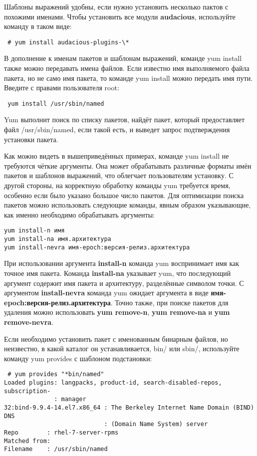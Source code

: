 \documentclass[a4paper,10pt,twoside]{article}
\begin{document}
Шаблоны выражений удобны, если нужно установить несколько пактов с похожими именами. Чтобы установить все модули \textbf{audacious}, используйте команду в таком виде:

\begin{verbatim}
 # yum install audacious-plugins-\*
\end{verbatim} 

В дополнение к именам пакетов и шаблонам выражений, команде yum install также можно передавать имена файлов. Если известно имя выполняемого файла пакета, но не само имя пакета, то команде yum install можно передать имя пути. Введите с правами пользователя root: 
\begin{verbatim}
 yum install /usr/sbin/named
\end{verbatim} 

Yum выполнит поиск по списку пакетов, найдёт пакет, который предоставляет файл /usr/sbin/named, если такой есть, и выведет запрос подтверждения установки пакета.

Как можно видеть в вышеприведённых примерах, команде  yum install не требуются чёткие аргументы. Она может обрабатывать различные форматы имён пакетов и шаблонов выражений, что облегчает пользователям установку. С другой стороны, на корректную обработку команды yum требуется время, особенно если было указано большое число пакетов. Для оптимизации поиска пакетов можно использовать следующие команды, явным образом указывающие, как именно необходимо обрабатывать аргументы:
\begin{verbatim}
yum install-n имя
yum install-na имя.архитектура
yum install-nevra имя-epoch:версия-релиз.архитектура
\end{verbatim} 


При использовании аргумента \textbf{install-n} команда yum воспринимает имя как точное имя пакета. Команда \textbf{install-na} указывает yum, что последующий аргумент содержит имя пакета и архитектуру, разделённые символом точки. С аргументом \textbf{install-nevra} команда yum ожидает аргумента в виде \textbf{имя-epoch:версия-релиз.архитектура}. Точно также, при поиске пакетов для удаления можно использовать \textbf{yum remove-n}, \textbf{yum remove-na} и \textbf{yum remove-nevra}.


Если необходимо установить пакет с именованным бинарным файлов, но неизвестно, в какой каталог он устанавливается, bin/ или sbin/, используйте команду yum provides с шаблоном подстановки:
\begin{verbatim}
 # yum provides "*bin/named"
Loaded plugins: langpacks, product-id, search-disabled-repos, subscription-
              : manager
32:bind-9.9.4-14.el7.x86_64 : The Berkeley Internet Name Domain (BIND) DNS
                            : (Domain Name System) server
Repo        : rhel-7-server-rpms
Matched from:
Filename    : /usr/sbin/named
\end{verbatim} 
\end{document}
